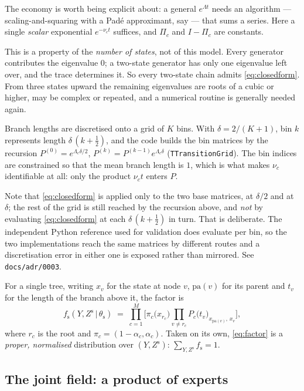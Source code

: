 \documentclass[11pt,a4paper]{article}
\newcommand{\Ys}{Y}
\newcommand{\Zs}{Z^{\mathrm{s}}}
\newcommand{\fs}{f_{\mathrm{s}}}
\newcommand{\pa}{\mathrm{pa}}
\newcommand{\given}{\,\vert\,}
\begin{document}
The economy is worth being explicit about: a general $e^{\Lambda t}$ needs an algorithm ---
scaling-and-squaring with a Pad\'e approximant, say --- that sums a series. Here a single
\emph{scalar} exponential $e^{-\nu_c t}$ suffices, and $\Pi_c$ and $I - \Pi_c$ are constants.

This is a property of the \emph{number of states}, not of this model. Every generator
contributes the eigenvalue $0$; a two-state generator has only one eigenvalue left over, and
the trace determines it. So every two-state chain admits \eqref{eq:closedform}. From three
states upward the remaining eigenvalues are roots of a cubic or higher, may be complex or
repeated, and a numerical routine is generally needed again.

Branch lengths are discretised onto a grid of $K$ bins. With
$\delta = 2/(K+1)$, bin $k$ represents length $\delta\,(k + \tfrac12)$, and the code builds
the bin matrices by the recursion
$P^{(0)} = e^{\Lambda_c \delta/2}$, $P^{(k)} = P^{(k-1)} e^{\Lambda_c \delta}$
(\texttt{TTransitionGrid}). The bin indices are constrained so that the mean
branch length is $1$, which is what makes $\nu_c$ identifiable at all: only the product
$\nu_c t$ enters $P$.

Note that \eqref{eq:closedform} is applied only to the two base matrices, at $\delta/2$ and at
$\delta$; the rest of the grid is still reached by the recursion above, and \emph{not} by
evaluating \eqref{eq:closedform} at each $\delta\,(k+\tfrac12)$ in turn. That is deliberate.
The independent Python reference used for validation does evaluate per bin, so the two
implementations reach the same matrices by different routes and a discretisation error in
either one is exposed rather than mirrored. See \texttt{docs/adr/0003}.

For a single tree, writing $x_v$ for the state at node $v$, $\pa(v)$ for its parent and
$t_v$ for the length of the branch above it, the factor is
\begin{equation}
  \fs(\Ys, \Zs \given \theta_{\mathrm{s}})
  \;=\;
  \prod_{c=1}^{M}
  \Biggl[
    \pi_c\bigl(x_{r_c}\bigr)
    \prod_{v \ne r_c} P_c\bigl(t_v\bigr)_{x_{\pa(v)},\, x_v}
  \Biggr],
  \label{eq:factor}
\end{equation}
where $r_c$ is the root and $\pi_c = (1-\alpha_c, \alpha_c)$. Taken on its own,
\eqref{eq:factor} is a \emph{proper, normalised} distribution over $(\Ys, \Zs)$:
$\sum_{\Ys,\Zs} \fs = 1$.

\subsection{The joint field: a product of experts}
\end{document}
